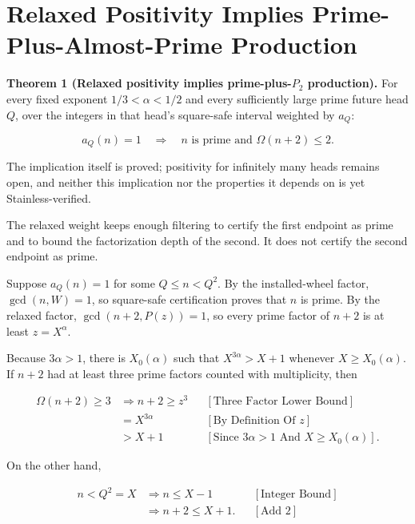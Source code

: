 \section{Relaxed Positivity Implies Prime-Plus-Almost-Prime Production}

\textbf{Theorem 1 (Relaxed positivity implies prime-plus-$P_2$ production).}
For every fixed exponent $1/3\lt\alpha\lt1/2$ and every sufficiently large
prime future head $Q$, over the integers in that head's square-safe interval
weighted by $a_Q$:

\begin{equation*}
a_Q(n)=1
\quad\Longrightarrow\quad
n\text{ is prime and }\Omega(n+2)\le2.
\end{equation*}

The implication itself is proved; positivity for infinitely many heads
remains open, and neither this implication nor the properties it depends on
is yet Stainless-verified.

The relaxed weight keeps enough filtering to certify the first endpoint as
prime and to bound the factorization depth of the second. It does not certify
the second endpoint as prime.

Suppose $a_Q(n)=1$ for some $Q\le n\lt Q^2$. By the installed-wheel factor,
$\gcd(n,W)=1$, so square-safe certification proves that $n$ is prime. By the
relaxed factor, $\gcd(n+2,P(z))=1$, so every prime factor of $n+2$ is at least
$z=X^\alpha$.

Because $3\alpha>1$, there is $X_0(\alpha)$ such that
$X^{3\alpha}>X+1$ whenever $X\ge X_0(\alpha)$. If $n+2$ had at least three
prime factors counted with multiplicity, then

\begin{equation*}
\begin{aligned}
\Omega(n+2)\ge3
&\Longrightarrow n+2\ge z^3
&&[\text{Three Factor Lower Bound}]\\
&=X^{3\alpha}
&&[\text{By Definition Of }z]\\
&>X+1
&&[\text{Since }3\alpha>1\text{ And }X\ge X_0(\alpha)].
\end{aligned}
\end{equation*}

On the other hand,

\begin{equation*}
\begin{aligned}
n\lt Q^2=X
&\Longrightarrow n\le X-1
&&[\text{Integer Bound}]\\
&\Longrightarrow n+2\le X+1.
&&[\text{Add }2]
\end{aligned}
\end{equation*}

